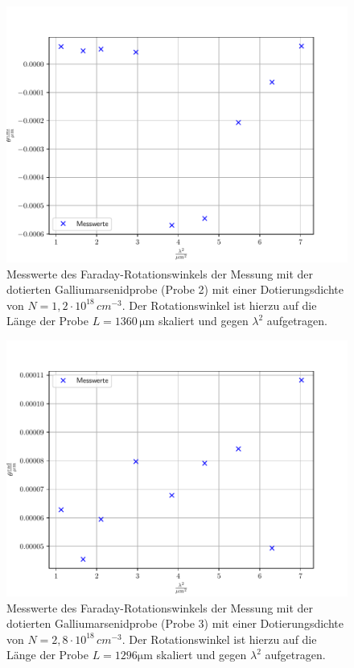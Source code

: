 \noindent
\FloatBarrier
\begin{figure}[h]
    \centering
    \includegraphics[width=1\textwidth]{Winkel_n-dotiert_1.pdf}
    \caption{Messwerte des Faraday-Rotationswinkels der Messung mit der dotierten Galliumarsenidprobe (Probe 2) mit einer Dotierungsdichte von $N=1,2\cdot 10^{18}\, \si{cm}^{-3}$. Der Rotationswinkel ist hierzu auf die Länge der Probe $L = 1360 \, \si{\micro\meter}$ skaliert und gegen $\lambda ^2$ aufgetragen.}
    \label{fig:afig3}
\end{figure}
\FloatBarrier
\noindent

\noindent
\FloatBarrier
\begin{figure}[h]
    \centering
    \includegraphics[width=1\textwidth]{Winkel_n-dotiert_2.pdf}
    \caption{Messwerte des Faraday-Rotationswinkels der Messung mit der dotierten Galliumarsenidprobe (Probe 3) mit einer Dotierungsdichte von $N=2,8\cdot 10^{18}\, \si{cm}^{-3}$. Der Rotationswinkel ist hierzu auf die Länge der Probe $L = 1296 \si{\micro\meter}$ skaliert und gegen $\lambda ^2$ aufgetragen.}
    \label{fig:afig4}
\end{figure}
\FloatBarrier
\noindent

